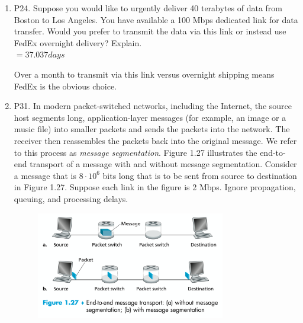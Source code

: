 \documentclass[12pt]{article}
\begin{document}
\begin{enumerate}
\item P24. Suppose you would like to urgently deliver 40 terabytes of data from Boston to Los Angeles. You have available a 100 Mbps dedicated link for data transfer. Would you prefer to transmit the data via this link or instead use FedEx overnight delivery? Explain.\\[1em]
\(=37.037 days\)\par
Over a month to transmit via this link versus overnight shipping means FedEx is the obvious choice.
\item P31. In modern packet-switched networks, including the Internet, the source host segments long, application-layer messages (for example, an image or a music file) into smaller packets and sends the packets into the network. The receiver then reassembles the packets back into the original message. We refer to this process as \textit{message segmentation}. Figure 1.27 illustrates the end-to-end transport of a message with and without message segmentation. Consider a message that is \(8 \cdot 10^6\)  bits long that is to be sent from source to destination in Figure 1.27. Suppose each link in the figure is 2 Mbps. Ignore propagation, queuing, and processing delays.
\begin{figure}[h!]
    \centering
    \includegraphics[width=0.78\textwidth]{Fig1.27.png}
    \end{figure}


\end{enumerate}
\end{document}

